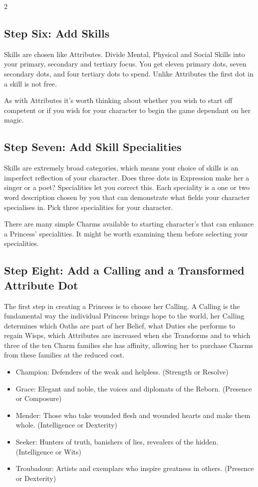 \begin{multicols}{2}
\subsection*{Step Six: Add Skills}

Skills are chosen like Attributes. Divide Mental, Physical and Social Skills into your primary, secondary and tertiary focus. You get eleven primary dots, seven secondary dots, and four tertiary dots to spend. Unlike Attributes the first dot in a skill is not free. 

As with Attributes it's worth thinking about whether you wish to start off competent or if you wish for your character to begin the game dependant on her magic. 

\subsection*{Step Seven: Add Skill Specialities}
 
Skills are extremely broad categories, which means your choice of skills is an imperfect reflection of your character. Does three dots in Expression make her a singer or a poet? Specialities let you correct this. Each speciality is a one or two word description chosen by you that can demonstrate what fields your character specialises in. Pick three specialities for your character. 
 
There are many simple Charms available to starting character's that can enhance a Princess' specialities. It might be worth examining them before selecting your specialities.  

\subsection*{Step Eight: Add a Calling and a Transformed Attribute Dot}

The first step in creating a Princess is to choose her Calling. A Calling is the fundamental way the individual Princess brings hope to the world, her Calling determines which Oaths are part of her Belief, what Duties she performs to regain Wisps, which Attributes are increased when she Transforms and to which three of the ten Charm families she has affinity, allowing her to purchase Charms from these families at the reduced cost.

\begin{itemize}
\item Champion: Defenders of the weak and helpless. (Strength or Resolve)
\item Grace: Elegant and noble, the voices and diplomats of the Reborn. (Presence or Composure) 
\item Mender: Those who take wounded flesh and wounded hearts and make them whole. (Intelligence or Dexterity)
\item Seeker: Hunters of truth, banishers of lies, revealers of the hidden. (Intelligence or Wits)
\item Troubadour: Artists and exemplars who inspire greatness in others. (Presence or Dexterity)
\end{itemize}


\end{multicols}

